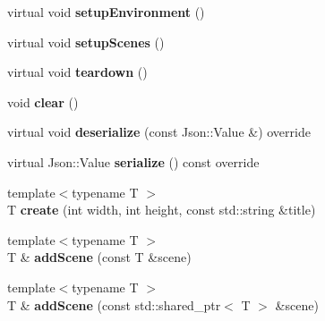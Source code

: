 \begin{DoxyCompactItemize}
\item 
\mbox{\label{classbkengine_1_1Game_a25f39d006ed6b37397d06cb6f951c33f}} 
virtual void {\bfseries setup\+Environment} ()
\item 
\mbox{\label{classbkengine_1_1Game_a4a6cdd8a4420d3b678b69c3648bb4a50}} 
virtual void {\bfseries setup\+Scenes} ()
\item 
\mbox{\label{classbkengine_1_1Game_a3729fd20b2303995d17f2aab824c55ff}} 
virtual void {\bfseries teardown} ()
\item 
\mbox{\label{classbkengine_1_1Game_a8ba8d7bcda356ed584dc445184320ff7}} 
void {\bfseries clear} ()
\item 
\mbox{\label{classbkengine_1_1Game_ac6f616f1adabfb8622df30edbb63e7e7}} 
virtual void {\bfseries deserialize} (const Json\+::\+Value \&) override
\item 
\mbox{\label{classbkengine_1_1Game_a02fd84a6e0f0dfc82f360738581f9eed}} 
virtual Json\+::\+Value {\bfseries serialize} () const override
\item 
\mbox{\label{classbkengine_1_1Game_a64bd2346dbaa1bc5e3929f906ed94d95}} 
{\footnotesize template$<$typename T $>$ }\\T {\bfseries create} (int width, int height, const std\+::string \&title)
\item 
\mbox{\label{classbkengine_1_1Game_abf8ff1761ffb25fe79851b1fcfdc903d}} 
{\footnotesize template$<$typename T $>$ }\\T \& {\bfseries add\+Scene} (const T \&scene)
\item 
\mbox{\label{classbkengine_1_1Game_ac619f04cd598a677c7e1e9c6750401b6}} 
{\footnotesize template$<$typename T $>$ }\\T \& {\bfseries add\+Scene} (const std\+::shared\+\_\+ptr$<$ T $>$ \&scene)
\item 
\mbox{\label{classbkengine_1_1Game_ad4c1a8a7c88ff209cb575bcc978a7d47}} 

\end{DoxyCompactItemize}
